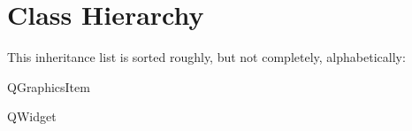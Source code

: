 \section{Class Hierarchy}
This inheritance list is sorted roughly, but not completely, alphabetically\+:\begin{DoxyCompactList}
\item Q\+Graphics\+Item\begin{DoxyCompactList}
\item {}
\item {}
\end{DoxyCompactList}
\item Q\+Widget\begin{DoxyCompactList}
\item {}
\end{DoxyCompactList}
\end{DoxyCompactList}
